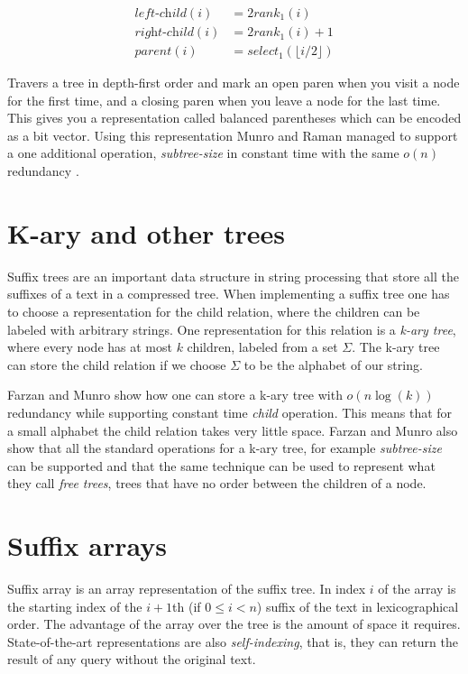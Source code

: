 \documentclass[11pt]{article}
\newcommand{\smallo}{o}
\newcommand{\rank}{\textit{rank}}
\newcommand{\select}{\textit{select}}
\begin{document}
\begin{align*}
  \textit{left-child}(i) &= 2\rank_1(i) \\
  \textit{right-child}(i) &= 2\rank_1(i) + 1 \\
  \textit{parent}(i) &= \select_1(\lfloor i / 2 \rfloor )
\end{align*}

Travers a tree in depth-first order and mark an open paren when you
visit a node for the first time, and a closing paren when you leave a
node for the last time. This gives you a representation called
balanced parentheses which can be encoded as a bit vector. Using this
representation Munro and Raman managed to support a one additional
operation, \textit{subtree-size} in constant time with the same
$\smallo(n)$ redundancy \cite{munro01}.

\section{K-ary and other trees}

Suffix trees are an important data structure in string processing that
store all the suffixes of a text in a compressed tree. When
implementing a suffix tree one has to choose a representation for the
child relation, where the children can be labeled with arbitrary
strings. One representation for this relation is a \emph{k-ary tree},
where every node has at most $k$ children, labeled from a set
$\Sigma$. The k-ary tree can store the child relation if we choose
$\Sigma$ to be the alphabet of our string.

Farzan and Munro show \cite{farzan08} how one can store a k-ary tree
with $\smallo(n\log(k))$ redundancy while supporting constant time
\textit{child} operation. This means that for a small alphabet the
child relation takes very little space. Farzan and Munro also show
that all the standard operations for a k-ary tree, for example
\textit{subtree-size} can be supported and that the same technique can
be used to represent what they call \emph{free trees}, trees that have
no order between the children of a node.

\section{Suffix arrays}

Suffix array is an array representation of the suffix tree. In index
$i$ of the array is the starting index of the $i+1$th (if $0 \le i <
n$) suffix of the text in lexicographical order. The advantage of the
array over the tree is the amount of space it requires.
State-of-the-art representations are also \emph{self-indexing}, that
is, they can return the result of any query without the original text.
\end{document}
